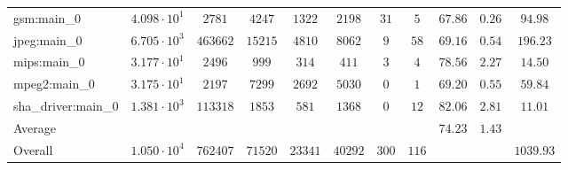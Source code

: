 \begin{tabular}{|l|c|c|c|c|c|c|c|c|c|c|}
gsm:main\_0             & $ 4.098 \cdot 10^{1} $ & $ 2781   $ & $ 4247  $ & $ 1322  $ & $ 2198  $ & $ 31  $ & $ 5   $ & $ 67.86       $ & $ 0.26    $ & $ 94.98   $ \\
jpeg:main\_0            & $ 6.705 \cdot 10^{3} $ & $ 463662 $ & $ 15215 $ & $ 4810  $ & $ 8062  $ & $ 9   $ & $ 58  $ & $ 69.16       $ & $ 0.54    $ & $ 196.23  $ \\
mips:main\_0            & $ 3.177 \cdot 10^{1} $ & $ 2496   $ & $ 999   $ & $ 314   $ & $ 411   $ & $ 3   $ & $ 4   $ & $ 78.56       $ & $ 2.27    $ & $ 14.50   $ \\
mpeg2:main\_0           & $ 3.175 \cdot 10^{1} $ & $ 2197   $ & $ 7299  $ & $ 2692  $ & $ 5030  $ & $ 0   $ & $ 1   $ & $ 69.20       $ & $ 0.55    $ & $ 59.84   $ \\
sha\_driver:main\_0     & $ 1.381 \cdot 10^{3} $ & $ 113318 $ & $ 1853  $ & $ 581   $ & $ 1368  $ & $ 0   $ & $ 12  $ & $ 82.06       $ & $ 2.81    $ & $ 11.01   $ \\
\hline
Average                 & $                    $ & $        $ & $       $ & $       $ & $       $ & $     $ & $     $ & $ 74.23       $ & $ 1.43    $ & $         $ \\
\hline
Overall                 & $ 1.050 \cdot 10^{4} $ & $ 762407 $ & $ 71520 $ & $ 23341 $ & $ 40292 $ & $ 300 $ & $ 116 $ & $             $ & $         $ & $ 1039.93 $ \\
\hline
\end{tabular}
